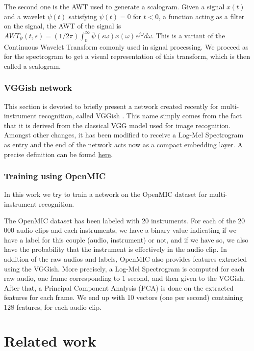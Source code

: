 \documentclass[final]{cvpr}
\begin{document}
The second one is the AWT used to generate a scalogram. Given a signal $x(t)$ and a wavelet $\psi(t)$ satisfying $\psi(t)=0$ for $t<0$, a function acting as a filter on the signal, the AWT of the signal is $AWT_{\psi}(t,s)=(1/2\pi)\int_0^\infty \bar{\psi}(s\omega)x(\omega)e^{j\omega}d\omega$. This is a variant of the Continuous Wavelet Transform comonly used in signal processing. We proceed as for the spectrogram to get a visual representation of this transform, which is then called a scalogram.
\subsubsection{VGGish network}
This section is devoted to briefly present a network created recently for multi-instrument recognition, called VGGish \cite{VGGish_net}. This name simply comes from the fact that it is derived from the classical VGG model \cite{vgg} used for image recognition. Amongst other changes, it has been modified to receive a Log-Mel Spectrogram as entry and the end of the network acts now as a compact embedding layer. A precise definition can be found \href{https://github.com/tensorflow/models/tree/master/research/audioset/vggish}{here}.
\subsubsection{Training using OpenMIC}
In this work we try to train a network on the OpenMIC dataset for multi-instrument recognition. 

The OpenMIC dataset has been labeled with 20 instruments. For each of the 20 000 audio clips and each instruments, we have a binary value indicating if we have a label for this couple (audio, instrument) or not, and if we have so, we also have the probability that the instrument is effectively in the audio clip. In addition of the raw audios and labels, OpenMIC also provides features extracted using the VGGish. More precisely, a Log-Mel Spectrogram is computed for each raw audio, one frame corresponding to 1 second, and then given to the VGGish. After that, a Principal Component Analysis (PCA) is done on the extracted features for each frame. We end up with 10 vectors (one per second) containing 128 features, for each audio clip.
\section{Related work}
\end{document}
